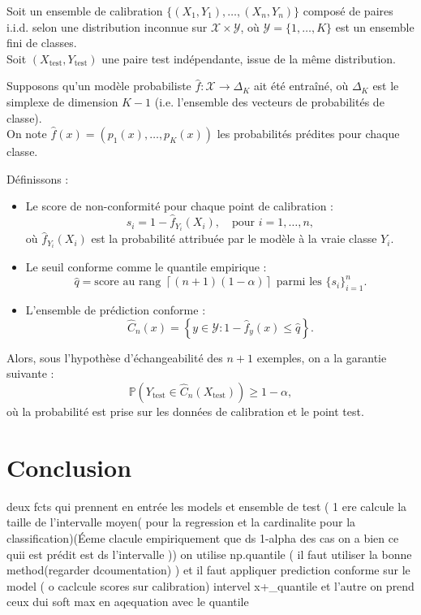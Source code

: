 \documentclass[a4paper,12pt]{article}%
\begin{document}
    \begin{theorem}
        Soit un ensemble de calibration $\{(X_1, Y_1), \dots, (X_n, Y_n)\}$ composé de paires i.i.d. selon une distribution inconnue sur $\mathcal{X} \times \mathcal{Y}$, où $\mathcal{Y} = \{1, \dots, K\}$ est un ensemble fini de classes.\\
        Soit $(X_{\text{test}}, Y_{\text{test}})$ une paire test indépendante, issue de la même distribution.
        
        Supposons qu'un modèle probabiliste $\hat{f} : \mathcal{X} \rightarrow \Delta_K$ ait été entraîné, où $\Delta_K$ est le simplexe de dimension $K-1$ (i.e. l'ensemble des vecteurs de probabilités de classe).\\
        On note $\hat{f}(x) = (p_1(x), \dots, p_K(x))$ les probabilités prédites pour chaque classe.
        
        Définissons :
        \begin{itemize}
            \item Le score de non-conformité pour chaque point de calibration :
            \[
            s_i = 1 - \hat{f}_{Y_i}(X_i), \quad \text{pour } i = 1, \dots, n,
            \]
            où $\hat{f}_{Y_i}(X_i)$ est la probabilité attribuée par le modèle à la vraie classe $Y_i$.
           
            \item Le seuil conforme comme le quantile empirique :
            \[
            \hat{q} = \text{score au rang } \left\lceil (n+1)(1 - \alpha) \right\rceil \text{ parmi les } \{s_i\}_{i=1}^n.
            \]
           
            \item L'ensemble de prédiction conforme :
            \[
            \hat{C}_n(x) = \left\{ y \in \mathcal{Y} : 1 - \hat{f}_y(x) \leq \hat{q} \right\}.
            \]
        \end{itemize}
        
        Alors, sous l'hypothèse d'échangeabilité des $n+1$ exemples, on a la garantie suivante :
        \[
        \mathbb{P}\left( Y_{\text{test}} \in \hat{C}_n(X_{\text{test}}) \right) \geq 1 - \alpha,
        \]
        où la probabilité est prise sur les données de calibration et le point test.
        \end{theorem}



\section{Conclusion}
    deux fcts qui prennent en entrée les models et ensemble de test ( 1 ere calcule la taille de l'intervalle moyen( pour la regression et la cardinalite pour  la classification)(Éeme clacule empiriquement que ds 1-alpha des cas on a bien ce quii est prédit est ds l'intervalle ))
    on utilise  np.quantile ( il faut utiliser la bonne method(regarder dcoumentation) )
    et il faut appliquer prediction conforme sur le model ( o caclcule scores sur calibration)
    intervel x+_quantile et l'autre on prend ceux dui soft max en aqequation avec le quantile
    
\end{document}
